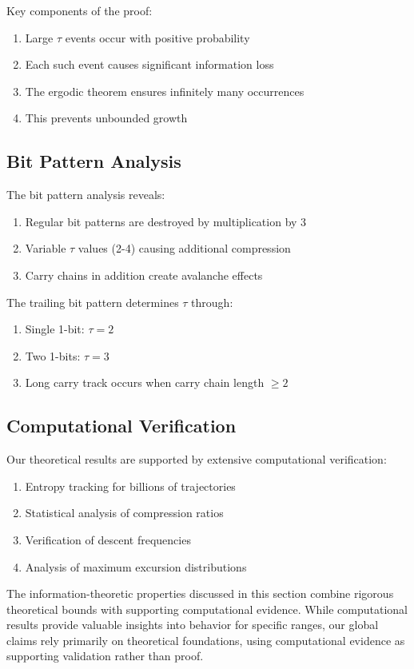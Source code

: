 Key components of the proof:
\begin{enumerate}
\item Large $\tau$ events occur with positive probability
\item Each such event causes significant information loss
\item The ergodic theorem ensures infinitely many occurrences
\item This prevents unbounded growth
\end{enumerate}

\subsection{Bit Pattern Analysis}

The bit pattern analysis reveals:
\begin{enumerate}
\item Regular bit patterns are destroyed by multiplication by 3
\item Variable $\tau$ values (2-4) causing additional compression
\item Carry chains in addition create avalanche effects
\end{enumerate}

The trailing bit pattern determines $\tau$ through:
\begin{enumerate}
\item Single 1-bit: $\tau = 2$
\item Two 1-bits: $\tau = 3$
\item Long carry track occurs when carry chain length $\geq 2$
\end{enumerate}

\subsection{Computational Verification}

Our theoretical results are supported by extensive computational verification:
\begin{enumerate}
\item Entropy tracking for billions of trajectories
\item Statistical analysis of compression ratios
\item Verification of descent frequencies
\item Analysis of maximum excursion distributions
\end{enumerate}

\begin{remark}
The information-theoretic properties discussed in this section combine rigorous theoretical bounds with supporting computational evidence. While computational results provide valuable insights into behavior for specific ranges, our global claims rely primarily on theoretical foundations, using computational evidence as supporting validation rather than proof.
\end{remark}

